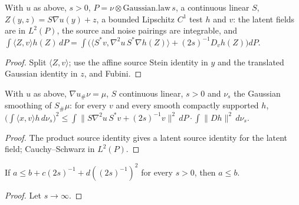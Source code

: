 \begin{lemma}
  \label{lem:gaussian-product-source-stein}
  \leanok
  With $u$ as above, $s>0$, $P=\nu\otimes\mathrm{Gaussian.law}\,s$, a continuous linear $S$, $Z(y,z)=S\nabla u(y)+z$, a bounded
  Lipschitz $C^1$ test $h$ and $v$: the latent fields are in $L^2(P)$, the source and noise pairings are integrable, and
  $\int\langle Z,v\rangle h(Z)\,dP=\int\bigl(\langle S^{*}v,\nabla^2u\,S^{*}\nabla h(Z)\rangle+(2s)^{-1}D_vh(Z)\bigr)dP$.
\end{lemma}
\begin{proof}
  \leanok
  Split $\langle Z,v\rangle$; use the affine source Stein identity in $y$ and the translated Gaussian identity in $z$, and
  Fubini.
\end{proof}

\begin{lemma}
  \label{lem:gaussian-product-compact-dual}
  \leanok
  With $u$ as above, $\nabla u_\#\nu=\mu$, $S$ continuous linear, $s>0$ and $\nu_s$ the Gaussian smoothing of $S_\#\mu$:
  for every $v$ and every smooth compactly supported $h$,
  $\bigl(\int\langle x,v\rangle h\,d\nu_s\bigr)^2\le\int\|S\nabla^2u\,S^{*}v+(2s)^{-1}v\|^2\,dP\cdot\int\|Dh\|^2\,d\nu_s$.
\end{lemma}
\begin{proof}
  \leanok
  The product source identity gives a latent source identity for the latent field; Cauchy--Schwarz in $L^2(P)$.
\end{proof}

\begin{lemma}
  \label{lem:gaussian-noise-limit}
  \leanok
  If $a\le b+c(2s)^{-1}+d((2s)^{-1})^2$ for every $s>0$, then $a\le b$.
\end{lemma}
\begin{proof}
  \leanok
  Let $s\to\infty$.
\end{proof}

